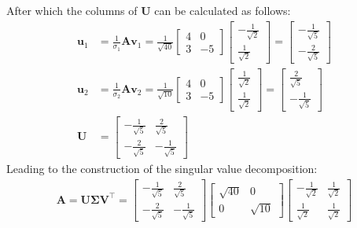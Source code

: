 \documentclass[a4paper,12pt]{article}
\newcommand{\matrx}[1]{\bm{#1}}
\newcommand{\vectr}[1]{\textbf{#1}}
\begin{document}
	After which the columns of $ \matrx{U} $ can be calculated as follows:
	\begin{align}
		\vectr{u}_1 &= \frac{1}{\sigma_1} \matrx{A} \vectr{v}_1 = \frac{1}{\sqrt{40}} \begin{bmatrix}
			4 & 0 \\
			3 & -5 
		\end{bmatrix} \begin{bmatrix}
			-\frac{1}{\sqrt{2}} \\ \frac{1}{\sqrt{2}}
		\end{bmatrix} = \begin{bmatrix}
			-\frac{1}{\sqrt{5}} \\ 
			-\frac{2}{\sqrt{5}}
		\end{bmatrix} \\
		\vectr{u}_2 &= \frac{1}{\sigma_2} \matrx{A} \vectr{v}_2 = \frac{1}{\sqrt{10}} \begin{bmatrix}
			4 & 0 \\
			3 & -5 
		\end{bmatrix} \begin{bmatrix}
			\frac{1}{\sqrt{2}} \\ \frac{1}{\sqrt{2}}
		\end{bmatrix} = \begin{bmatrix}
			\frac{2}{\sqrt{5}} \\ 
			-\frac{1}{\sqrt{5}}
		\end{bmatrix} \\
		\matrx{U} &= \begin{bmatrix}
			-\frac{1}{\sqrt{5}} & \frac{2}{\sqrt{5}} \\ 
			-\frac{2}{\sqrt{5}} & -\frac{1}{\sqrt{5}}
		\end{bmatrix}
	\end{align}
	Leading to the construction of the singular value decomposition:
	\begin{align}
		\matrx{A} = \matrx{U} \matrx{\Sigma} \matrx{V}^{\top} = \begin{bmatrix}
			-\frac{1}{\sqrt{5}} & \frac{2}{\sqrt{5}} \\ 
			-\frac{2}{\sqrt{5}} & -\frac{1}{\sqrt{5}}
		\end{bmatrix}  \begin{bmatrix}
			\sqrt{40} & 0 \\
			0 & \sqrt{10}
		\end{bmatrix}  \begin{bmatrix}
			-\frac{1}{\sqrt{2}} & \frac{1}{\sqrt{2}} \\
			\frac{1}{\sqrt{2}} & \frac{1}{\sqrt{2}}
		\end{bmatrix} 
	\end{align}
\end{document}
